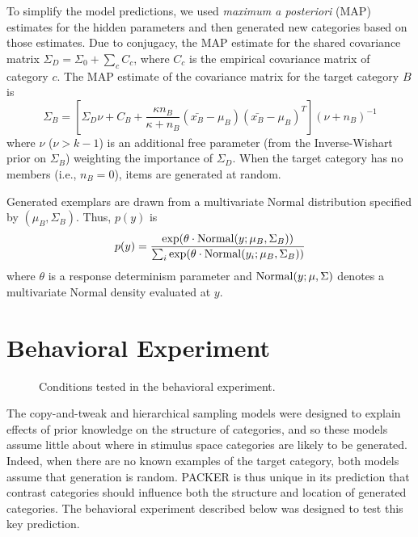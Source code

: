 \documentclass[10pt,letterpaper]{article}
\begin{document}
To simplify the model predictions, we used {\em maximum a posteriori} (MAP) estimates for the hidden parameters and then generated new categories based on those estimates. Due to conjugacy, the MAP estimate for the shared covariance matrix $\Sigma_D = \Sigma_0 + \sum_c{C_c}$, where $C_c$ is the empirical covariance matrix of category $c$. The MAP estimate of the covariance matrix for the target category $B$ is 
\begin{equation}
  \Sigma_B = \left[ \Sigma_D \nu + C_B +
    \dfrac
    {\kappa n_B}
    {\kappa + n_B}
    (\bar{x_B}-\mu_B)(\bar{x_B}-\mu_B)^T
  \right] (\nu + n_B)^{-1}
  \label{eq:Sigma_B}
\end{equation}
%
where $\nu$ ($\nu>k-1$) is an additional free parameter (from the Inverse-Wishart prior on $\Sigma_B$) weighting the importance of $\Sigma_{D}$. When the target category has no members (i.e., $n_B = 0$), items are generated at random.

Generated exemplars are drawn from a multivariate Normal distribution specified by $(\mu_{B}, \Sigma_{B})$. Thus, $p(y)$ is
\begin{equation}
  p(y) = \dfrac
    {\exp( \theta \cdot {\rm Normal}(y; \mu_{B}, \Sigma_{B}))}
    {\sum_i \exp( \theta \cdot {\rm Normal}(y_i; \mu_{B}, \Sigma_{B}))} 
\end{equation}
where $\theta$ is a response determinism parameter and ${\rm Normal}(y; \mu, \Sigma)$ denotes a multivariate Normal density evaluated at $y$. 

\section{Behavioral Experiment}

\begin{figure}
    \begin{center}
    
    \caption{Conditions tested in the behavioral experiment.}
    \label{fig:middle-bottom-conditions}
    \end{center}
\end{figure}


The copy-and-tweak and hierarchical sampling models were designed to explain effects of prior knowledge on the structure of categories, and so these models assume little about where in stimulus space categories are likely to be generated. Indeed, when there are no known examples of the target category, both models assume that generation is random. PACKER is thus unique in its prediction that contrast categories should influence both the structure and location of generated categories. The behavioral experiment described below was designed to test this key prediction. 
\end{document}

